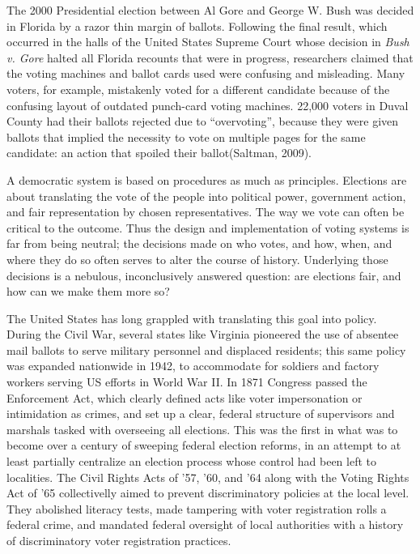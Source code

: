 \documentclass[12pt,twoside]{reedthesis}
\begin{document}
  The 2000 Presidential election between Al Gore and George W. Bush was
  decided in Florida by a razor thin margin of ballots. Following the
  final result, which occurred in the halls of the United States Supreme
  Court whose decision in \emph{Bush v. Gore} halted all Florida recounts
  that were in progress, researchers claimed that the voting machines and
  ballot cards used were confusing and misleading. Many voters, for
  example, mistakenly voted for a different candidate because of the
  confusing layout of outdated punch-card voting machines. 22,000 voters
  in Duval County had their ballots rejected due to ``overvoting'',
  because they were given ballots that implied the necessity to vote on
  multiple pages for the same candidate: an action that spoiled their
  ballot(Saltman, 2009).
  
  A democratic system is based on procedures as much as principles.
  Elections are about translating the vote of the people into political
  power, government action, and fair representation by chosen
  representatives. The way we vote can often be critical to the outcome.
  Thus the design and implementation of voting systems is far from being
  neutral; the decisions made on who votes, and how, when, and where they
  do so often serves to alter the course of history. Underlying those
  decisions is a nebulous, inconclusively answered question: are elections
  fair, and how can we make them more so?
  
  The United States has long grappled with translating this goal into
  policy. During the Civil War, several states like Virginia pioneered the
  use of absentee mail ballots to serve military personnel and displaced
  residents; this same policy was expanded nationwide in 1942, to
  accommodate for soldiers and factory workers serving US efforts in World
  War II. In 1871 Congress passed the Enforcement Act, which clearly
  defined acts like voter impersonation or intimidation as crimes, and set
  up a clear, federal structure of supervisors and marshals tasked with
  overseeing all elections. This was the first in what was to become over
  a century of sweeping federal election reforms, in an attempt to at
  least partially centralize an election process whose control had been
  left to localities. The Civil Rights Acts of '57, '60, and '64 along
  with the Voting Rights Act of '65 collectivelly aimed to prevent
  discriminatory policies at the local level. They abolished literacy
  tests, made tampering with voter registration rolls a federal crime, and
  mandated federal oversight of local authorities with a history of
  discriminatory voter registration practices.
  
\end{document}
